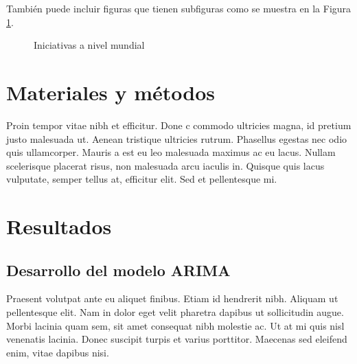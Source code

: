 \documentclass[artMGITG,SIG,accept,moreauthors,font4]{mgitg}
\begin{document}
También puede incluir figuras que tienen subfiguras como se muestra en la Figura \ref{fig3}.

\begin{figure}[!ht]
    \centering
    \hfill
    \caption{Iniciativas a nivel mundial}
    \label{fig3}
\end{figure}


\section{Materiales y métodos}
%
\noindent
Proin tempor vitae nibh et efficitur. Done c commodo ultricies magna, id pretium justo malesuada ut. Aenean tristique ultricies rutrum. Phasellus egestas nec odio quis ullamcorper. Mauris a est eu leo malesuada maximus ac eu lacus. Nullam scelerisque placerat risus, non malesuada arcu iaculis in. Quisque quis lacus vulputate, semper tellus at, efficitur elit. Sed et pellentesque mi.

\section{Resultados}
%
\unskip
\subsection{Desarrollo del modelo ARIMA} 
%
\noindent
Praesent volutpat ante eu aliquet finibus. Etiam id hendrerit nibh. Aliquam ut pellentesque elit. Nam in dolor eget velit pharetra dapibus ut sollicitudin augue. Morbi lacinia quam sem, sit amet consequat nibh molestie ac. Ut at mi quis nisl venenatis lacinia. Donec suscipit turpis et varius porttitor. Maecenas sed eleifend enim, vitae dapibus nisi.
\end{document}

